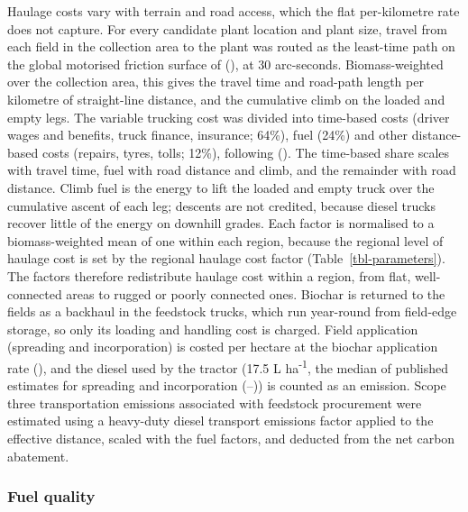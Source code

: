 \documentclass[
  letterpaper,
]{article}
\begin{document}
Haulage costs vary with terrain and road access, which the flat
per-kilometre rate does not capture. For every candidate plant location
and plant size, travel from each field in the collection area to the
plant was routed as the least-time path on the global motorised friction
surface of (), at 30 arc-seconds.
Biomass-weighted over the collection area, this gives the travel time
and road-path length per kilometre of straight-line distance, and the
cumulative climb on the loaded and empty legs. The variable trucking
cost was divided into time-based costs (driver wages and benefits, truck
finance, insurance; 64\%), fuel (24\%) and other distance-based costs
(repairs, tyres, tolls; 12\%), following
(). The time-based share scales with
travel time, fuel with road distance and climb, and the remainder with
road distance. Climb fuel is the energy to lift the loaded and empty
truck over the cumulative ascent of each leg; descents are not credited,
because diesel trucks recover little of the energy on downhill grades.
Each factor is normalised to a biomass-weighted mean of one within each
region, because the regional level of haulage cost is set by the
regional haulage cost factor (Table~\ref{tbl-parameters}). The factors
therefore redistribute haulage cost within a region, from flat,
well-connected areas to rugged or poorly connected ones. Biochar is
returned to the fields as a backhaul in the feedstock trucks, which run
year-round from field-edge storage, so only its loading and handling
cost is charged. Field application (spreading and incorporation) is
costed per hectare at the biochar application rate
(), and the diesel used by the
tractor (17.5 L ha\textsuperscript{-1}, the median of published
estimates for spreading and incorporation
(--))
is counted as an emission. Scope three transportation emissions
associated with feedstock procurement were estimated using a heavy-duty
diesel transport emissions factor applied to the effective distance,
scaled with the fuel factors, and deducted from the net carbon
abatement.

\subsubsection{Fuel quality}\label{fuel-quality}
\end{document}
